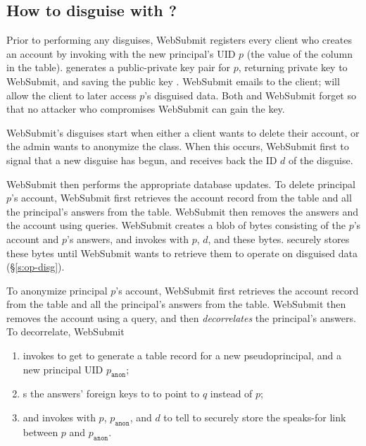 \subsection{How to disguise with \sys?}

Prior to performing any disguises, WebSubmit registers every client who creates an account by
invoking  with the new principal's UID $p$ (the value of the  column in the  table).
\sys generates a public-private key pair for $p$, returning private key  to 
WebSubmit, and saving the public key .
WebSubmit emails  to the client;  will allow the client to later access $p$'s
disguised data. Both \sys and WebSubmit forget  so that no attacker who compromises
WebSubmit can gain the key. 

WebSubmit's disguises start when either a client wants to delete their account, or the admin wants
to anonymize the class.
When this occurs, WebSubmit first  to signal \sys that a new disguise has begun,
and receives back the ID $d$ of the disguise.

WebSubmit then performs the appropriate database updates.  To delete principal $p$'s account,
WebSubmit first retrieves the account record from the  table and all the principal's
answers from the  table. WebSubmit then removes the answers and the account using
 queries.  WebSubmit creates a blob of bytes consisting of the $p$'s account and $p$'s
answers, and invokes  with $p$, $d$, and these bytes. \sys securely stores
these bytes until WebSubmit wants to retrieve them to operate on disguised data (\S\ref{s:op-disg}). 

To anonymize principal $p$'s account, WebSubmit first retrieves the account record from the 
table and all the principal's answers from the  table. WebSubmit then removes the
account using a  query, and then \emph{decorrelates} the principal's answers. 
To decorrelate, WebSubmit
\begin{enumerate}
%
\item invokes  to get \sys to generate a  table record for a new
    pseudoprincipal, and a new principal UID $p_{\texttt{anon}}$;
%
\item {}s the answers' foreign keys to  to point to $q$ instead of $p$;
%
\item and invokes  with $p$, $p_{\texttt{anon}}$, and $d$ to tell
    \sys to securely store the speaks-for link between $p$ and $p_{\texttt{anon}}$.
\end{enumerate}

